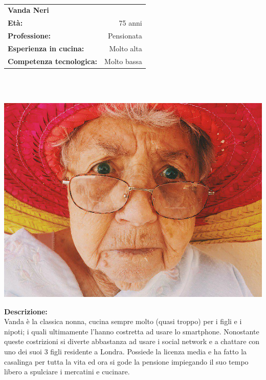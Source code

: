 \hrulefill\\
\begin{minipage}{.75\textwidth}
\begin{tabular}{l |r }
	\textbf{Vanda Neri} & \\
	\textbf{Età:} & 75 anni\\
	\textbf{Professione:} & Pensionata\\
	\textbf{Esperienza in cucina:} & Molto alta\\
	\textbf{Competenza tecnologica:} & Molto bassa\\
\end{tabular}\\\\
\end{minipage}
\begin{minipage}{.24\textwidth}
	\includegraphics[width=\textwidth]{img/personas/vanda}
\end{minipage}
	
	\textbf{Descrizione:}\\
	Vanda è la classica nonna, cucina sempre molto (quasi troppo) per i
	figli e i nipoti; i quali ultimamente l'hanno costretta ad usare lo
	smartphone.  Nonostante queste costrizioni si diverte abbastanza ad
	usare i social network e a chattare con uno dei suoi 3 figli residente a
	Londra.  Possiede la licenza media e ha fatto la casalinga per tutta la
	vita ed ora si gode la pensione impiegando il suo tempo libero a
	spulciare i mercatini e cucinare.
